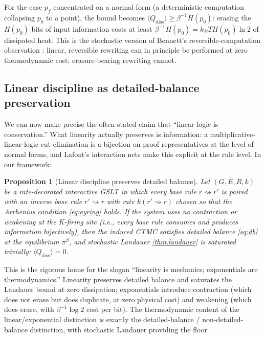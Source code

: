 \documentclass[11pt]{article}
\theoremstyle{plain}
\newtheorem{proposition}[theorem]{Proposition}
\theoremstyle{definition}
\theoremstyle{remark}
\newcommand{\rew}{\rightsquigarrow}
\newcommand{\ie}{\textit{i.e.}}
\begin{document}
For the case $p_f$ concentrated on a normal form (a deterministic computation collapsing $p_0$ to a point), the bound becomes $\langle Q_{\mathrm{diss}} \rangle \geq \beta^{-1} H(p_0)$: erasing the $H(p_0)$ bits of input information costs at least $\beta^{-1} H(p_0) = k_B T H(p_0) \ln 2$ of dissipated heat. This is the stochastic version of Bennett's reversible-computation observation \cite{Bennett73,Bennett82}: linear, reversible rewriting can in principle be performed at zero thermodynamic cost; erasure-bearing rewriting cannot.

\subsection{Linear discipline as detailed-balance preservation}

We can now make precise the often-stated claim that ``linear logic is conservation.'' What linearity actually preserves is information: a multiplicative-linear-logic cut elimination is a bijection on proof representatives at the level of normal forms, and Lafont's interaction nets \cite{Lafont90} make this explicit at the rule level. In our framework:

\begin{proposition}[Linear discipline preserves detailed balance]\label{prop:lindb}
Let $(G, E, R, k)$ be a rate-decorated interactive GSLT in which every base rule $r \rew r'$ is paired with an inverse base rule $r' \rew r$ with rate $k(r' \rew r)$ chosen so that the Arrhenius condition \eqref{eq:eyring} holds. If the system uses no contraction or weakening at the K-firing site (\ie, every base rule consumes and produces information bijectively), then the induced CTMC satisfies detailed balance \eqref{eq:db} at the equilibrium $\pi^\beta$, and stochastic Landauer \eqref{thm:landauer} is saturated trivially: $\langle Q_{\mathrm{diss}}\rangle = 0$.
\end{proposition}

This is the rigorous home for the slogan ``linearity is mechanics; exponentials are thermodynamics.'' Linearity preserves detailed balance and saturates the Landauer bound at zero dissipation; exponentials introduce contraction (which does not erase but does duplicate, at zero physical cost) and weakening (which does erase, with $\beta^{-1} \log 2$ cost per bit). The thermodynamic content of the linear/exponential distinction is exactly the detailed-balance / non-detailed-balance distinction, with stochastic Landauer providing the floor.
\end{document}
